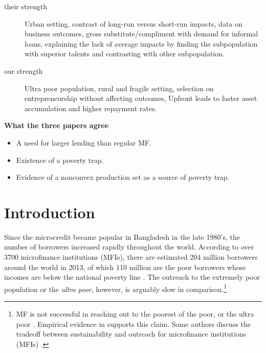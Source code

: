 \begin{description}
\vspace{1.0ex}\setlength{\itemsep}{1.0ex}\setlength{\baselineskip}{12pt}
\item[their strength]	Urban setting, contrast of long-run versus short-run impacts, data on business outcomes, gross substitute/compliment with demand for informal loans, explaining the lack of average impacts by finding the subpopulation with superior talents and contrasting with other subpopulation.
\item[our strength]	Ultra poor population, rural and fragile setting, selection on entrepreneurship without affecting outcomes, \textsf{Upfront} leads to faster asset accumulation and higher repayment rates.
\end{description}

\noindent
\textbf{What the three papers agree}

\begin{itemize}
\vspace{1.0ex}\setlength{\itemsep}{1.0ex}\setlength{\baselineskip}{12pt}
\item	A need for larger lending than regular MF.
\item	Existence of a poverty trap.
\item	Evidence of a nonconvex production set as a source of poverty trap.
\end{itemize}

\newpage
\setcounter{tocdepth}{3}
\tableofcontents
\newpage

\setlength{\parindent}{1em}
\vspace{2ex}




\renewcommand{\thefootnote}{*\arabic{footnote}}
\setcounter{footnote}{0}



\section{Introduction}
\label{SecIntroduction}


	Since the microcredit became popular in Bangladesh in the late 1980's, the number of borrowers increased rapidly throughout the world. According to over 3700 microfinance institutions (MFIs), there are estimated 204 million borrowers around the world in 2013, of which 110 million are the poor borrowers whose incomes are below the national poverty line \citep{MFGateway2015}. The outreach to the extremely poor population or the \textit{ultra poor}, however, is arguably slow in comparison.\footnote{MF is not successful in reaching out to the poorest of the poor, or the ultra poor \citep[][]{Scully2004}. Empirical evidence in \citet{Yaron1994, Navajas2000, RahmanRazzaque2000, AghionMorduch2007} supports this claim. Some authors discuss the tradeoff between sustainability and outreach for microfinance institutions (MFIs) \citet{HermesLensink2011, HermesLensinkMeesters2011, Cull2011}. } 

